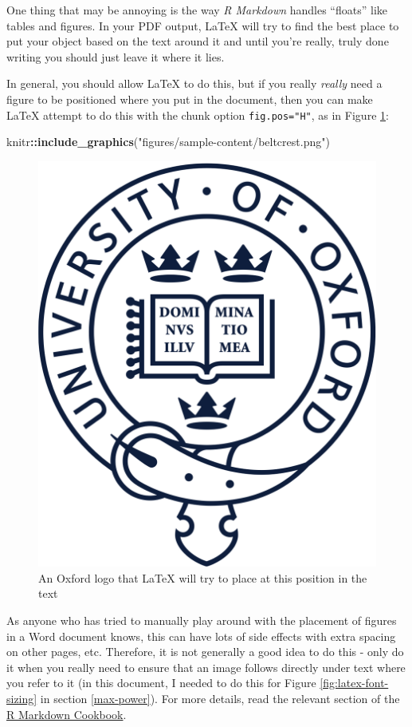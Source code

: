 \documentclass[a4paper, twoside]{templates/ociamthesis}
\newenvironment{Shaded}{\begin{snugshade}}{\end{snugshade}}
\newcommand{\KeywordTok}[1]{\textcolor[rgb]{0.13,0.29,0.53}{\textbf{#1}}}
\newcommand{\NormalTok}[1]{#1}
\newcommand{\OperatorTok}[1]{\textcolor[rgb]{0.81,0.36,0.00}{\textbf{#1}}}
\newcommand{\StringTok}[1]{\textcolor[rgb]{0.31,0.60,0.02}{#1}}
\renewenvironment{Shaded}
{
  \vspace{10pt}%
  \begin{snugshade}%
}{%
  \end{snugshade}%
  \vspace{8pt}%
}
\theoremstyle{definition}
\theoremstyle{definition}
\theoremstyle{definition}
\theoremstyle{definition}
\theoremstyle{remark}
\begin{document}
One thing that may be annoying is the way \emph{R Markdown} handles ``floats'' like tables and figures.
In your PDF output, LaTeX will try to find the best place to put your object based on the text around it and until you're really, truly done writing you should just leave it where it lies.

In general, you should allow LaTeX to do this, but if you really \emph{really} need a figure to be positioned where you put in the document, then you can make LaTeX attempt to do this with the chunk option \texttt{fig.pos="H"}, as in Figure \ref{fig:oxford-logo-controlled}:

\begin{Shaded}
\begin{Highlighting}[]
\NormalTok{knitr}\OperatorTok{::}\KeywordTok{include\_graphics}\NormalTok{(}\StringTok{"figures/sample{-}content/beltcrest.png"}\NormalTok{)}
\end{Highlighting}
\end{Shaded}

\begin{figure}[H]

{\centering \includegraphics[width=0.5\linewidth]{figures/sample-content/beltcrest} 

}

\caption{An Oxford logo that LaTeX will try to place at this position in the text}\label{fig:oxford-logo-controlled}
\end{figure}

As anyone who has tried to manually play around with the placement of figures in a Word document knows, this can have lots of side effects with extra spacing on other pages, etc.
Therefore, it is not generally a good idea to do this - only do it when you really need to ensure that an image follows directly under text where you refer to it (in this document, I needed to do this for Figure \ref{fig:latex-font-sizing} in section \ref{max-power}).
For more details, read the relevant section of the \href{https://bookdown.org/yihui/rmarkdown-cookbook/figure-placement.html}{R Markdown Cookbook}.
\end{document}
